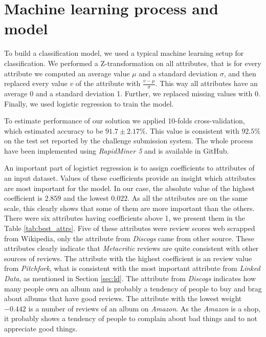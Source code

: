 \documentclass{llncs}
\begin{document}
\section{Machine learning process and model\label{sec:ml}}

To build a classification model, we used a typical machine learning setup for classification.
We performed a Z-transformation on all attributes, that is for every attribute we computed an average value $\mu$ and a standard deviation $\sigma$, and then replaced every value $v$ of the attribute with $\frac{v-\mu}{\sigma}$.
This way all attributes have an average 0 and a standard deviation 1.
Further, we replaced missing values with 0.
Finally, we used logistic regression \cite{logistic_regression} to train the model.

To estimate performance of our solution we applied 10-folds cross-validation, which estimated accuracy to be $91.7\pm 2.17\%$.
This value is consistent with $92.5\%$ on the test set reported by the challenge submission system.
The whole process have been implemented using \emph{RapidMiner 5} and is available in GitHub.

An important part of logistict regression is to assign coefficients to attributes of an input dataset.
Values of these coefficients provide an insight which attributes are most important for the model.
In our case, the absolute value of the highest coefficient is $2.859$ and the lowest $0.022$.
As all the attributes are on the same scale, this clearly shows that some of them are more important than the others.
There were six attributes having coefficients above 1, we present them in the Table \ref{tab:best_attrs}.
Five of these attributes were review scores web scrapped from Wikipedia, only the attribute from \emph{Discogs} came from other source.
These attributes clearly indicate that \emph{Metacritic} reviews are quite consistent with other sources of reviews.
The attribute with the highest coefficient is an review value from \emph{Pitchfork}, what is consistent with the most important attribute from \emph{Linked Data}, as mentioned in Section \ref{sec:ld}.
The attribute from \emph{Discogs} indicates how many people own an album and is probably a tendency of people to buy and brag about albums that have good reviews.
The attribute with the lowest weight $-0.442$ is a number of reviews of an album on \emph{Amazon}.
As the \emph{Amazon} is a shop, it probably shows a tendency of people to complain about bad things and to not appreciate good things.
\end{document}
